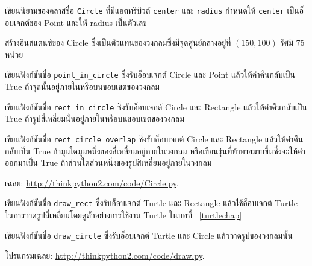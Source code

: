 \begin{exercise}


เขียนนิยามของคลาสชื่อ {\tt Circle} ที่มีแอตทริบิวต์ {\tt center} และ {\tt radius} กำหนดให้ {\tt center} เป็นอ็อบเจกต์ของ Point และให้ radius เป็นตัวเลข


สร้างอินสแตนซ์ของ Circle ซึ่งเป็นตัวแทนของวงกลมซึ่งมีจุดศูนย์กลางอยู่ที่ {\scriptsize$(150, 100)$} รัศมี 75 หน่วย

เขียนฟังก์ชันชื่อ \verb"point_in_circle" ซึ่งรับอ็อบเจกต์ Circle และ Point แล้วให้ค่าคืนกลับเป็น True ถ้าจุดนั้นอยู่ภายในหรือบนขอบเขตของวงกลม


เขียนฟังก์ชันชื่อ \verb"rect_in_circle" ซึ่งรับอ็อบเจกต์ Circle และ Rectangle แล้วให้ค่าคืนกลับเป็น True ถ้ารูปสี่เหลี่ยมนั้นอยู่ภายในหรือบนขอบเขตของวงกลม



เขียนฟังก์ชันชื่อ \verb"rect_circle_overlap" ซึ่งรับอ็อบเจกต์ Circle และ Rectangle 
แล้วให้ค่าคืนกลับเป็น True ถ้ามุมใดมุมหนึ่งของสี่เหลี่ยมอยู่ภายในวงกลม หรือเขียนรุ่นที่ท้าทายมากขึ้นซึ่งจะให้ค่าออกมาเป็น True 
ถ้าส่วนใดส่วนหนึ่งของรูปสี่เหลี่ยมอยู่ภายในวงกลม


เฉลย: \url{http://thinkpython2.com/code/Circle.py}.

\end{exercise}


\begin{exercise}


เขียนฟังก์ชันชื่อ \verb|draw_rect| ซึ่งรับอ็อบเจกต์  Turtle และ  Rectangle แล้วใช้อ็อบเจกต์ Turtle 
ในการวาดรูปสี่เหลี่ยมโดยดูตัวอย่างการใช้งาน Turtle ในบทที่ ~\ref{turtlechap}

เขียนฟังก์ชันชื่อ \verb|draw_circle| ซึ่งรับอ็อบเจกต์ Turtle และ  Circle แล้ววาดรูปของวงกลมนั้น

โปรแกรมเฉลย: \url{http://thinkpython2.com/code/draw.py}.

\end{exercise}



